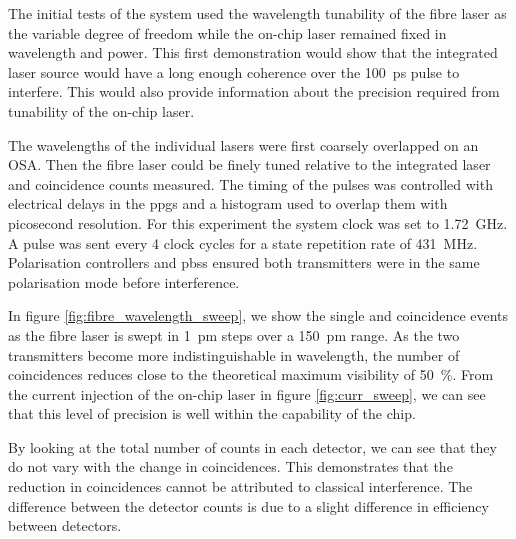 


The initial tests of the system used the wavelength tunability of the fibre laser as the variable degree of freedom while the on-chip laser remained fixed in wavelength and power. This first demonstration would show that the integrated laser source would have a long enough coherence over the \SI{100}{ps} pulse to interfere. This would also provide information about the precision required from tunability of the on-chip laser. 

The wavelengths of the individual lasers were first coarsely overlapped on an \ac{OSA}. Then the fibre laser could be finely tuned relative to the integrated laser and coincidence counts measured. The timing of the pulses was controlled with electrical delays in the \acp{ppg} and a histogram used to overlap them with picosecond resolution. For this experiment the system clock was set to \SI{1.72}{\GHz}. A pulse was sent every 4 clock cycles for a state repetition rate of \SI{431}{\MHz}. Polarisation controllers and \acp{pbs} ensured both transmitters were in the same polarisation mode before interference.

In figure \ref{fig:fibre_wavelength_sweep}, we show the single and coincidence events as the fibre laser is swept in \SI{1}{pm} steps over a \SI{150}{pm} range. As the two transmitters become more indistinguishable in wavelength, the number of coincidences reduces close to the theoretical maximum visibility of \SI{50}{\percent}. From the current injection of the on-chip laser in figure \ref{fig:curr_sweep}, we can see that this level of precision is well within the capability of the chip.

By looking at the total number of counts in each detector, we can see that they do not vary with the change in coincidences. This demonstrates that the reduction in coincidences cannot be attributed to classical interference. The difference between the detector counts is due to a slight difference in efficiency between detectors.


